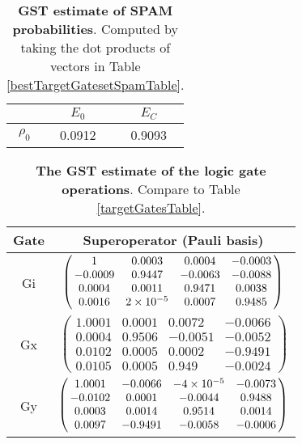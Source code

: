 {\begin{table}[h]
\begin{center}
\begin{tabular}[l]{|c|c|c|}
\hline
 & $E_{0}$ & $E_C$ \\ \hline
$\rho_{0}$ & 0.0912 & 0.9093 \\ \hline
\end{tabular}

\caption{\textbf{GST estimate of SPAM probabilities}.  Computed by taking the dot products of vectors in Table \ref{bestTargetGatesetSpamTable}.\label{bestTargetGatesetSpamParametersTable}}
\end{center}
\end{table}

\begin{table}[h]
\begin{center}
\begin{tabular}[l]{|c|c|}
\hline
Gate & Superoperator (Pauli basis) \\ \hline
Gi & $ \left(\!\!\begin{array}{cccc}
1 & 0.0003 & 0.0004 & -0.0003 \\ 
-0.0009 & 0.9447 & -0.0063 & -0.0088 \\ 
0.0004 & 0.0011 & 0.9471 & 0.0038 \\ 
0.0016 & 2\times 10^{-5} & 0.0007 & 0.9485
 \end{array}\!\!\right) $
 \\ \hline
Gx & $ \left(\!\!\begin{array}{cccc}
1.0001 & 0.0001 & 0.0072 & -0.0066 \\ 
0.0004 & 0.9506 & -0.0051 & -0.0052 \\ 
0.0102 & 0.0005 & 0.0002 & -0.9491 \\ 
0.0105 & 0.0005 & 0.949 & -0.0024
 \end{array}\!\!\right) $
 \\ \hline
Gy & $ \left(\!\!\begin{array}{cccc}
1.0001 & -0.0066 & -4\times 10^{-5} & -0.0073 \\ 
-0.0102 & 0.0001 & -0.0044 & 0.9488 \\ 
0.0003 & 0.0014 & 0.9514 & 0.0014 \\ 
0.0097 & -0.9491 & -0.0058 & -0.0006
 \end{array}\!\!\right) $
 \\ \hline
\end{tabular}

\caption{\textbf{The GST estimate of the logic gate operations}.  Compare to Table \ref{targetGatesTable}.\label{bestTargetGatesetGatesTable}}
\end{center}
\end{table}

}
